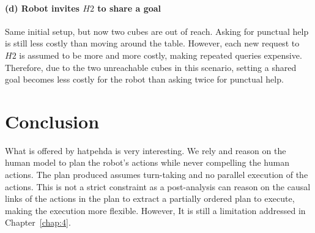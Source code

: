 \paragraph{(d) Robot invites $H2$ to share a goal}
Same initial setup, but now two cubes are out of reach. Asking for punctual help is still less costly than moving around the table. 
However, each new request to $H2$ is assumed to be more and more costly, making repeated queries expensive.  
Therefore, due to the two unreachable cubes in this scenario, setting a shared goal becomes less costly for the robot than asking twice for punctual help.

\section{Conclusion}

What is offered by \acrshort{hatpehda} is very interesting. We rely and reason on the human model to plan the robot's actions while never compelling the human actions. The plan produced assumes turn-taking and no parallel execution of the actions. This is not a strict constraint as a post-analysis can reason on the causal links of the actions in the plan to extract a partially ordered plan to execute, making the execution more flexible. However, It is still a limitation addressed in Chapter~\ref{chap:4}.